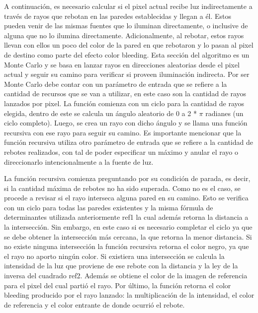 \documentclass[conference]{IEEEtran}
\begin{document}
A continuación, es necesario calcular si el pixel actual recibe luz indirectamente a través de rayos que rebotan en las paredes establecidas y llegan a él. Estos pueden venir de las mismas fuentes que lo iluminan directamente, o inclusive de alguna que no lo ilumina directamente. Adicionalmente, al rebotar, estos rayos llevan con ellos un poco del color de la pared en que rebotaron y lo pasan al pixel de destino como parte del efecto color bleeding. Esta sección del algoritmo es un Monte Carlo y se basa en lanzar rayos en direcciones aleatorias desde el pixel actual y seguir su camino para verificar si proveen iluminación indirecta. Por ser Monte Carlo debe contar con un parámetro de entrada que se refiere a la cantidad de recursos que se van a utilizar, en este caso son la cantidad de rayos lanzados por pixel. La función comienza con un ciclo para la cantidad de rayos elegida, dentro de este se calcula un ángulo aleatorio de 0 a 2 * $\pi$ radianes (un ciclo completo). Luego, se crea un rayo con dicho ángulo y se llama una función recursiva con ese rayo para seguir su camino. Es importante mencionar que la función recursiva utiliza otro parámetro de entrada que se refiere a la cantidad de rebotes realizados, con tal de poder especificar un máximo y anular el rayo o direccionarlo intencionalmente a la fuente de luz.

La función recursiva comienza preguntando por su condición de parada, es decir, si la cantidad máxima de rebotes no ha sido superada. Como no es el caso, se procede a revisar si el rayo interseca alguna pared en su camino. Esto se verifica con un ciclo para todas las paredes existentes y la misma fórmula de determinantes utilizada anteriormente ref1 la cual además retorna la distancia a la intersección. Sin embargo, en este caso si es necesario completar el ciclo ya que se debe obtener la intersección más cercana, la que retorna la menor distancia. Si no existe ninguna intersección la función recursiva retorna el color negro, ya que el rayo no aporto ningún color. Si existiera una intersección se calcula la intensidad de la luz que proviene de ese rebote con la distancia y la ley de la inversa del cuadrado ref2. Además se obtiene el color de la imagen de referencia para el pixel del cual partió el rayo. Por último, la función retorna el color bleeding producido por el rayo lanzado: la multiplicación de la intensidad, el color de referencia y el color entrante de donde ocurrió el rebote.
\end{document}
